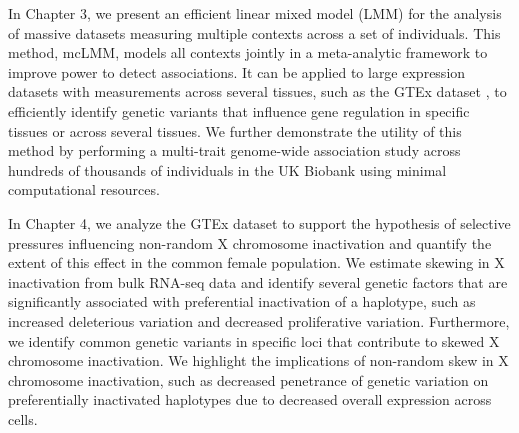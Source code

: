 In Chapter 3, we present an efficient linear mixed model (LMM) for the analysis of massive datasets measuring multiple contexts across a set of individuals. This method, mcLMM, models all contexts jointly in a meta-analytic framework to improve power to detect associations. It can be applied to large expression datasets with measurements across several tissues, such as the GTEx dataset \cite{GTEx_Consortium2020-xx}, to efficiently identify genetic variants that influence gene regulation in specific tissues or across several tissues. We further demonstrate the utility of this method by performing a multi-trait genome-wide association study across hundreds of thousands of individuals in the UK Biobank \cite{Bycroft2018} using minimal computational resources.

In Chapter 4, we analyze the GTEx dataset \cite{GTEx_Consortium2020-xx} to support the hypothesis of selective pressures influencing non-random X chromosome inactivation \cite{Migeon1998-gc} and quantify the extent of this effect in the common female population. We estimate skewing in X inactivation from bulk RNA-seq data and identify several genetic factors that are significantly associated with preferential inactivation of a haplotype, such as increased deleterious variation and decreased proliferative variation. Furthermore, we identify common genetic variants in specific loci that contribute to skewed X chromosome inactivation. We highlight the implications of non-random skew in X chromosome inactivation, such as decreased penetrance of genetic variation on preferentially inactivated haplotypes due to decreased overall expression across cells.